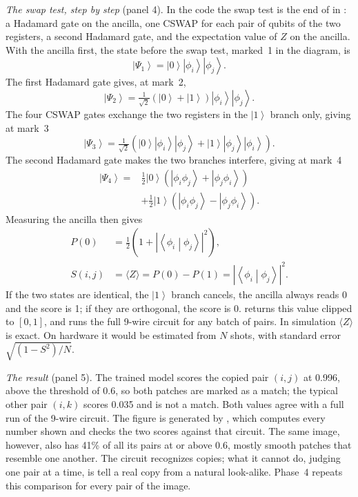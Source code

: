 \documentclass[conference]{IEEEtran}
\newcommand{\ket}[1]{\left|#1\right\rangle}
\newcommand{\braket}[2]{\left\langle#1\middle|#2\right\rangle}
\begin{document}
\emph{The swap test, step by step} (panel 4). In the code the swap test is the end of  in : a Hadamard gate on the ancilla, one CSWAP for each pair of qubits of the two registers, a second Hadamard gate, and the expectation value of $Z$ on the ancilla. With the ancilla first, the state before the swap test, marked~1 in the diagram, is
\begin{equation}
\ket{\Psi_1} = \ket{0}\ket{\phi_i}\ket{\phi_j}.
\end{equation}
The first Hadamard gate gives, at mark~2,
\begin{equation}
\ket{\Psi_2} = \tfrac{1}{\sqrt2}\left(\ket{0}+\ket{1}\right)\ket{\phi_i}\ket{\phi_j}.
\end{equation}
The four CSWAP gates exchange the two registers in the $\ket{1}$ branch only, giving at mark~3
\begin{equation}
\ket{\Psi_3} = \tfrac{1}{\sqrt2}\left(\ket{0}\ket{\phi_i}\ket{\phi_j} + \ket{1}\ket{\phi_j}\ket{\phi_i}\right).
\end{equation}
The second Hadamard gate makes the two branches interfere, giving at mark~4
\begin{equation}
\begin{split}
\ket{\Psi_4} = {} & \tfrac12\ket{0}\left(\ket{\phi_i\phi_j}+\ket{\phi_j\phi_i}\right)\\
& + \tfrac12\ket{1}\left(\ket{\phi_i\phi_j}-\ket{\phi_j\phi_i}\right).
\end{split}
\end{equation}
Measuring the ancilla then gives
\begin{align}
P(0) &= \tfrac12\left(1 + |\braket{\phi_i}{\phi_j}|^2\right), \nonumber\\
S(i,j) &= \langle Z\rangle = P(0)-P(1) = |\braket{\phi_i}{\phi_j}|^2 .
\label{eq:zswap}
\end{align}
If the two states are identical, the $\ket{1}$ branch cancels, the ancilla always reads 0 and the score is 1; if they are orthogonal, the score is 0.  returns this value clipped to $[0,1]$, and  runs the full 9-wire circuit for any batch of pairs. In simulation $\langle Z\rangle$ is exact. On hardware it would be estimated from $N$ shots, with standard error $\sqrt{(1-S^2)/N}$.

\emph{The result} (panel 5). The trained model scores the copied pair $(i,j)$ at 0.996, above the threshold of 0.6, so both patches are marked as a match; the typical other pair $(i,k)$ scores 0.035 and is not a match. Both values agree with a full run of the 9-wire circuit. The figure is generated by , which computes every number shown and checks the two scores against that circuit. The same image, however, also has 41\% of all its pairs at or above 0.6, mostly smooth patches that resemble one another. The circuit recognizes copies; what it cannot do, judging one pair at a time, is tell a real copy from a natural look-alike. Phase~4 repeats this comparison for every pair of the image.
\end{document}
